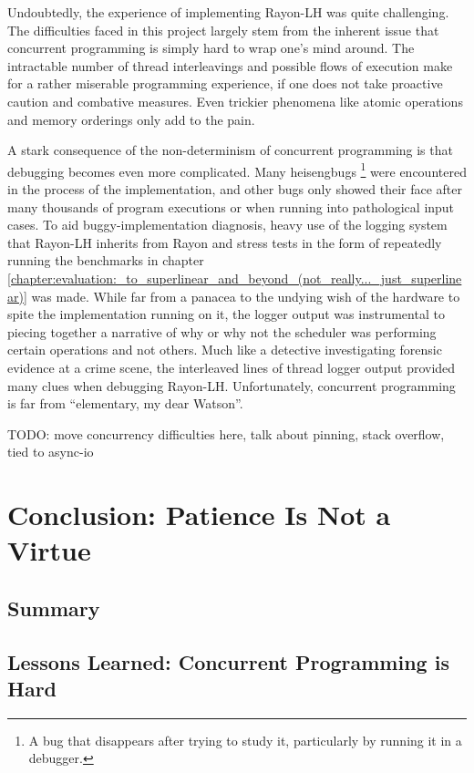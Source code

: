\documentclass[bsc,frontabs,singlespacing,parskip,deptreport,normalheadings]{infthesis}
\begin{document}
Undoubtedly, the experience of implementing Rayon-LH was quite challenging.
The difficulties faced in this project largely stem from the inherent issue that
concurrent programming is simply hard to wrap one's mind around. The intractable
number of thread interleavings and possible flows of execution make for a rather
miserable programming experience, if one does not take proactive caution and
combative measures. Even trickier phenomena like atomic operations and memory
orderings only add to the pain.

A stark consequence of the non-determinism of concurrent programming is that
debugging becomes even more complicated. Many heisengbugs \footnote{A bug that
disappears after trying to study it, particularly by running it in a debugger.}
were encountered in the process of the implementation, and other bugs only
showed their face after many thousands of program executions or when running
into pathological input cases. To aid buggy-implementation diagnosis, heavy use
of the logging system that Rayon-LH inherits from Rayon and stress tests in the
form of repeatedly running the benchmarks in chapter
\ref{chapter:evaluation:_to_superlinear_and_beyond_(not_really..._just_superlinear)}
was made. While far from a panacea to the undying wish of the hardware to spite
the implementation running on it, the logger output was instrumental to piecing
together a narrative of why or why not the scheduler was performing certain
operations and not others. Much like a detective investigating forensic evidence
at a crime scene, the interleaved lines of thread logger output provided many
clues when debugging Rayon-LH. Unfortunately, concurrent programming is far from
``elementary, my dear Watson''.

TODO: move concurrency difficulties here, talk about pinning, stack overflow,
tied to async-io


\chapter{Conclusion: Patience Is Not a Virtue}

\section{Summary}

\section{Lessons Learned: Concurrent Programming is Hard}
\end{document}
